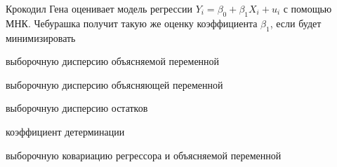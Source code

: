 
\begin{question}
Крокодил Гена оценивает модель регрессии \(Y_i = \beta_0 + \beta_1 X_i + u_i\) с помощью МНК.
Чебурашка получит такую же оценку коэффициента \(\beta_1\), если будет минимизировать
\begin{answerlist}
  \item выборочную дисперсию объясняемой переменной
  \item выборочную дисперсию объясняющей переменной
  \item выборочную дисперсию остатков
  \item коэффициент детерминации
  \item выборочную ковариацию регрессора и объясняемой переменной
\end{answerlist}
\end{question}


